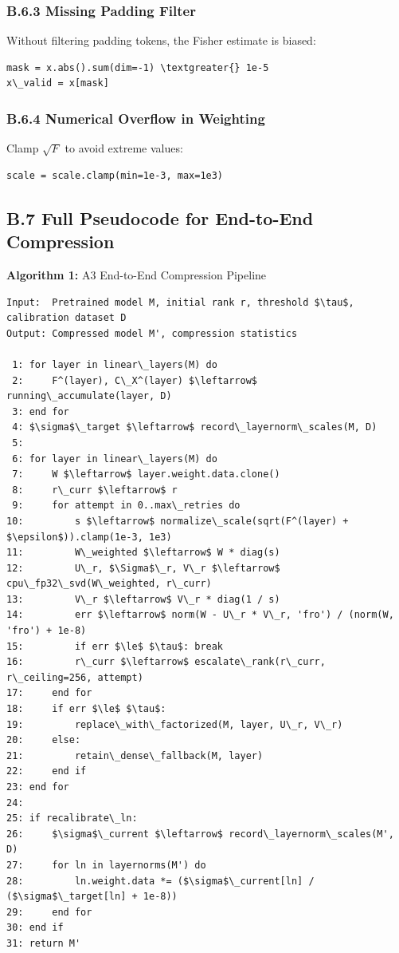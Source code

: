 \subsubsection{B.6.3 Missing Padding Filter}

Without filtering padding tokens, the Fisher estimate is biased:

\begin{lstlisting}
mask = x.abs().sum(dim=-1) \textgreater{} 1e-5
x\_valid = x[mask]
\end{lstlisting}

\subsubsection{B.6.4 Numerical Overflow in Weighting}

Clamp $\sqrt{F}$ to avoid extreme values:

\begin{lstlisting}
scale = scale.clamp(min=1e-3, max=1e3)
\end{lstlisting}

\subsection{B.7 Full Pseudocode for End-to-End Compression}
\label{sec:app_algorithm1}

\textbf{Algorithm 1:} A3 End-to-End Compression Pipeline
\begin{lstlisting}
Input:  Pretrained model M, initial rank r, threshold $\tau$, calibration dataset D
Output: Compressed model M', compression statistics

 1: for layer in linear\_layers(M) do
 2:     F^(layer), C\_X^(layer) $\leftarrow$ running\_accumulate(layer, D)
 3: end for
 4: $\sigma$\_target $\leftarrow$ record\_layernorm\_scales(M, D)
 5:
 6: for layer in linear\_layers(M) do
 7:     W $\leftarrow$ layer.weight.data.clone()
 8:     r\_curr $\leftarrow$ r
 9:     for attempt in 0..max\_retries do
10:         s $\leftarrow$ normalize\_scale(sqrt(F^(layer) + $\epsilon$)).clamp(1e-3, 1e3)
11:         W\_weighted $\leftarrow$ W * diag(s)
12:         U\_r, $\Sigma$\_r, V\_r $\leftarrow$ cpu\_fp32\_svd(W\_weighted, r\_curr)
13:         V\_r $\leftarrow$ V\_r * diag(1 / s)
14:         err $\leftarrow$ norm(W - U\_r * V\_r, 'fro') / (norm(W, 'fro') + 1e-8)
15:         if err $\le$ $\tau$: break
16:         r\_curr $\leftarrow$ escalate\_rank(r\_curr, r\_ceiling=256, attempt)
17:     end for
18:     if err $\le$ $\tau$:
19:         replace\_with\_factorized(M, layer, U\_r, V\_r)
20:     else:
21:         retain\_dense\_fallback(M, layer)
22:     end if
23: end for
24:
25: if recalibrate\_ln:
26:     $\sigma$\_current $\leftarrow$ record\_layernorm\_scales(M', D)
27:     for ln in layernorms(M') do
28:         ln.weight.data *= ($\sigma$\_current[ln] / ($\sigma$\_target[ln] + 1e-8))
29:     end for
30: end if
31: return M'
\end{lstlisting}

